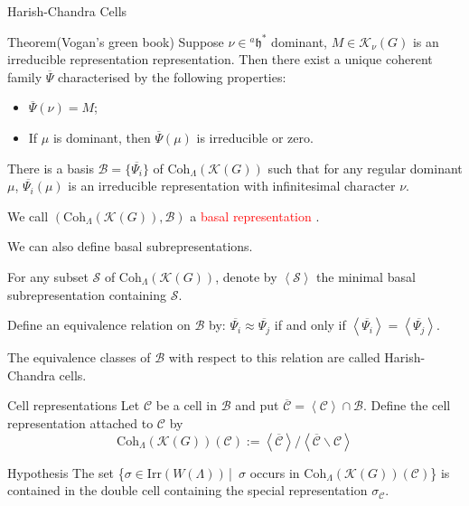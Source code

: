 \documentclass{beamer}
\newcommand{\CB}{{\mathcal {B}}}
\newcommand{\CC}{{\mathcal {C}}}
\newcommand{\CK}{{\mathcal {K}}}
\newcommand{\CS}{{\mathcal {S}}}
\newcommand{\fh}{\mathfrak{h}}
\newcommand{\Irr}{{\mathrm{Irr}}}
\newcommand{\set}[2]{\{#1\,|\,#2\}}
\renewcommand{\bar}{\overline}
\begin{document}
\begin{frame}{Harish-Chandra Cells}
  \begin{block}{Theorem(Vogan's green book)}
    Suppose $\nu \in {^{a}\fh}^*$ dominant, $M \in \CK_{\nu}(G)$ is an irreducible representation representation. Then there exist a unique coherent family $\bar{\Psi}$ characterised by the following properties:
    \begin{itemize}
      \item $\bar{\Psi}(\nu) = M$;
      \item If $\mu$ is dominant, then $\bar{\Psi}(\mu)$ is irreducible or zero.
    \end{itemize}
  \end{block}
  There is a basis $\CB = \{\bar{\Psi_i}\}$ of $\mathrm{Coh}_{\Lambda}(\CK(G))$ such that for any regular dominant $\mu$, $\bar{\Psi_i}(\mu)$ is an irreducible representation with infinitesimal character $\nu$.\par
  We call $(\mathrm{Coh}_{\Lambda}(\CK(G)),\CB)$ a \textcolor{red}{basal representation} .\par
  We can also define basal subrepresentations. 
\end{frame}






\begin{frame}
  For any subset $\CS$ of $\mathrm{Coh}_{\Lambda}(\CK(G))$, denote by $\left \langle \CS \right \rangle$ the minimal basal subrepresentation containing $\CS$.\par
  Define an equivalence relation on $\CB$ by: 
  $\bar{\Psi_i} \approx  \bar{\Psi_j}$ if and only if $\left \langle \bar{\Psi_i} \right \rangle = \left \langle \bar{\Psi_j} \right \rangle$.\par
  The equivalence classes of $\CB$ with respect to this relation are called Harish-Chandra cells.
  \begin{block}{Cell representations}
    Let $\CC$ be a cell in $\CB$ and put $\bar{\CC} = \left \langle \CC \right \rangle \cap \CB$. Define the cell representation attached to $\CC$ by
    \[ \mathrm{Coh}_{\Lambda}(\CK(G))(\CC) := \left \langle \bar{\CC} \right \rangle  / \left \langle \bar{\CC} \backslash \CC \right \rangle\] 
  \end{block}

  
\end{frame}





\begin{frame}
  \begin{block}{Hypothesis}
    The set \set{$\sigma \in \Irr(W(\Lambda))$}{ \textrm{$\sigma$ occurs in $\mathrm{Coh}_{\Lambda}(\CK(G))(\CC)$}} is contained in the double cell containing the special representation $\sigma_{\CC}$.
  \end{block}
\end{frame}
\end{document}
